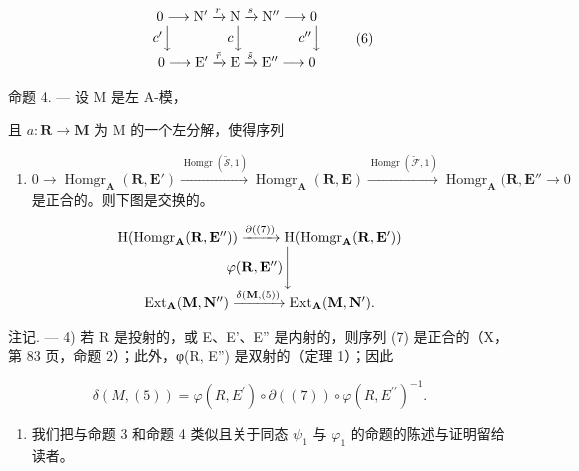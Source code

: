 \[
\begin{array}{c} 0 \longrightarrow \mathrm{N} ^ {\prime} \xrightarrow {r} \mathrm{N} \xrightarrow {s} \mathrm{N} ^ {\prime \prime} \longrightarrow 0 \\ c ^ {\prime} \Big \downarrow \qquad \qquad c \Big \downarrow \qquad \qquad c ^ {\prime \prime} \Big \downarrow \\ 0 \longrightarrow \mathrm{E} ^ {\prime} \xrightarrow {\tilde {r}} \mathrm{E} \xrightarrow {\tilde {s}} \mathrm{E} ^ {\prime \prime} \longrightarrow 0 \end{array}\tag{6}
\]

命题 4. --- 设 M 是左 A-模，

且 \(a: \mathbf{R} \to \mathbf{M}\) 为 M 的一个左分解，使得序列

\begin{enumerate}
\def\labelenumi{(\arabic{enumi})}
\setcounter{enumi}{6}
\tightlist
\item
  \(0 \to \operatorname{Homgr}_{\mathbf{A}}(\mathbf{R}, \mathbf{E}') \xrightarrow{\operatorname{Homgr}(\tilde{\mathcal{S}}, 1)} \operatorname{Homgr}_{\mathbf{A}}(\mathbf{R}, \mathbf{E}) \xrightarrow{\operatorname{Homgr}(\tilde{\mathcal{F}}, 1)} \operatorname{Homgr}_{\mathbf{A}}(\mathbf{R}, \mathbf{E}'' \to 0\) 是正合的。则下图是交换的。
\end{enumerate}

\[
\begin{array}{c} \mathrm{H} (\operatorname{Homgr} _ {\mathbf {A}} (\mathbf {R}, \mathbf {E} ^ {\prime \prime})) \xrightarrow {\partial ((7))} \mathrm{H} (\operatorname{Homgr} _ {\mathbf {A}} (\mathbf {R}, \mathbf {E} ^ {\prime})) \\ \varphi (\mathbf {R}, \mathbf {E} ^ {\prime \prime}) \Biggl \downarrow \\ \operatorname{Ext} _ {\mathbf {A}} (\mathbf {M}, \mathbf {N} ^ {\prime \prime}) \xrightarrow {\delta (\mathbf {M} , (5))} \operatorname{Ext} _ {\mathbf {A}} (\mathbf {M}, \mathbf {N} ^ {\prime}). \end{array}
\]

注记. --- 4) 若 R 是投射的，或 E、E'、E'' 是内射的，则序列 (7) 是正合的（X，第 83 页，命题 2）；此外，φ(R, E'') 是双射的（定理 1）；因此

\[
\delta (M, (5)) = \varphi (R, E ^ {\prime}) \circ \partial ((7)) \circ \varphi (R, E ^ {\prime \prime}) ^ {- 1}.
\]

\begin{enumerate}
\def\labelenumi{\arabic{enumi})}
\setcounter{enumi}{4}
\tightlist
\item
  我们把与命题 3 和命题 4 类似且关于同态 \(\psi_{1}\) 与 \(\varphi_{1}\) 的命题的陈述与证明留给读者。
\end{enumerate}

